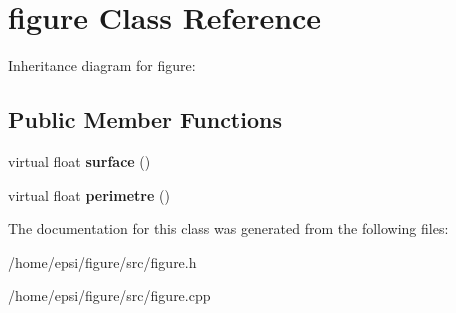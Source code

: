 \hypertarget{classfigure}{}\section{figure Class Reference}
\label{classfigure}


Inheritance diagram for figure\+:
\subsection*{Public Member Functions}
\begin{DoxyCompactItemize}
\item 
\mbox{\label{classfigure_ae301cacba1033c35834008e63ef103e8}} 
virtual float {\bfseries surface} ()
\item 
\mbox{\label{classfigure_aa17af226caeac91d8a3f67276bcbd2b6}} 
virtual float {\bfseries perimetre} ()
\end{DoxyCompactItemize}


The documentation for this class was generated from the following files\+:\begin{DoxyCompactItemize}
\item 
/home/epsi/figure/src/figure.\+h\item 
/home/epsi/figure/src/figure.\+cpp\end{DoxyCompactItemize}
